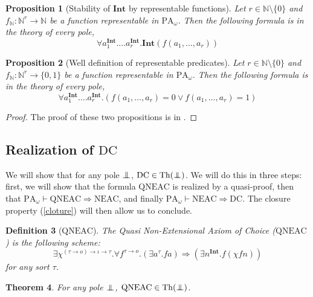 \documentclass[a4paper,12pt]{article}
\newtheorem{theo}{Theorem}[subsection]
\newtheorem{prop}[theo]{Proposition}
\newtheorem{defi}[theo]{Definition}
\theoremstyle{rmqstyle}
\newcommand{\N}{\mathbb{N}}
\newcommand{\PA}{\mathrm{PA}}
\renewcommand{\int}{\mathbf{Int}}
\renewcommand{\implies}{\Rightarrow}
\newcommand{\pole}{{\protect\mathpalette{\protect\polehelper}{\bot}}} \def\polehelper#1#2{\mathrel{\rlap{$#1#2$}\mkern3mu{#1#2}}}
\newcommand{\Th}{\mathrm{Th}}
\newcommand{\QNEAC}{\mathrm{QNEAC}}
\newcommand{\NEAC}{\mathrm{NEAC}}
\newcommand{\DC}{\mathrm{DC}}
\begin{document}
\begin{prop}[Stability of $\int$ by representable functions]
Let $r \in \N \setminus \{0\}$ and $f_\N : \N^r \to \N$ be a function representable in $\PA_\omega$. Then the following formula is in the theory of every pole,
$$\forall a_1^\int. \dots a_r^\int. \int(f(a_1, \dots, a_r))$$
\end{prop}

\begin{prop}[Well definition of representable predicates]
Let $r \in \N \setminus \{0\}$ and $f_\N : \N^r \to \{0,1\}$ be a function representable in $\PA_\omega$. Then the following formula is in the theory of every pole,
$$\forall a_1^\int. \dots a_r^\int. (f(a_1, \dots, a_r) = 0 \lor f(a_1, \dots, a_r) = 1)$$
\end{prop}

\begin{proof}
The proof of these two propositions is in \cite{KrivineRC}.
\end{proof}

\clearpage
\subsection{Realization of \( \DC \)}

We will show that for any pole $\pole$, $\DC \in \Th(\pole)$. We will do this in three steps: first, we will show that the formula $\QNEAC$ is realized by a quasi-proof, then that $\PA_\omega \vdash \QNEAC \implies \NEAC$, and finally $\PA_\omega \vdash \NEAC\implies \DC$. The closure property (\ref{cloture}) will then allow us to conclude.

\begin{defi}[$\QNEAC$]
The Quasi Non-Extensional Axiom of Choice ($\QNEAC$) is the following scheme:
$$\exists \chi^{(\tau \to o) \to \iota \to \tau}. \forall f^{\tau \to o}. (\exists a^\tau. fa) \implies (\exists n^\int. f(\chi f n))$$
for any sort $\tau$.
\end{defi}

\begin{theo}
\label{QNEAC}
For any pole $\pole$, $\QNEAC \in \Th(\pole)$.
\end{theo}
\end{document}
